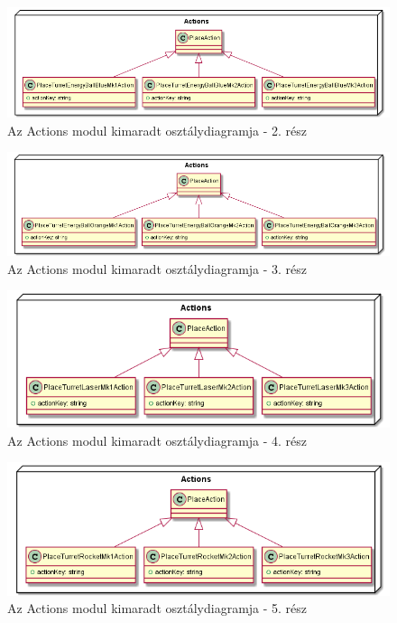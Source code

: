 \begin{figure}[h!]
	\centering
	\includegraphics[width=1.023\textwidth]{kepek/uml/actions/action-pt3.png}
	\caption{Az Actions modul kimaradt osztálydiagramja - 2. rész}
	\label{fig:uml:action-pt3}
\end{figure}

\begin{figure}[h!]
	\centering
	\includegraphics[width=1.0458\textwidth]{kepek/uml/actions/action-pt4.png}
	\caption{Az Actions modul kimaradt osztálydiagramja - 3. rész}
	\label{fig:uml:action-pt4}
\end{figure}

\begin{figure}[h!]
	\centering
	\includegraphics[width=1.015\textwidth]{kepek/uml/actions/action-pt5.png}
	\caption{Az Actions modul kimaradt osztálydiagramja - 4. rész}
	\label{fig:uml:action-pt5}
\end{figure}

\begin{figure}[h!]
	\centering
	\includegraphics[width=1.015\textwidth]{kepek/uml/actions/action-pt6.png}
	\caption{Az Actions modul kimaradt osztálydiagramja - 5. rész}
	\label{fig:uml:action-pt6}
\end{figure}



